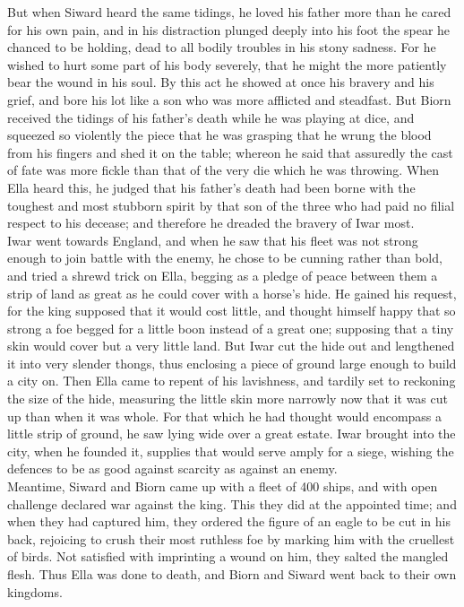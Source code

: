 \documentclass[10pt,a4paper]{report}
\begin{document}
But when Siward heard the same tidings, he loved his father more than he cared for his own pain, and in his distraction plunged deeply into his foot the spear he chanced to be holding, dead to all bodily troubles in his stony sadness. For he wished to hurt some part of his body severely, that he might the more patiently bear the wound in his soul. By this act he showed at once his bravery and his grief, and bore his lot like a son who was more afflicted and steadfast. But Biorn received the tidings of his father's death while he was playing at dice, and squeezed so violently the piece that he was grasping that he wrung the blood from his fingers and shed it on the table; whereon he said that assuredly the cast of fate was more fickle than that of the very die which he was throwing. When Ella heard this, he judged that his father's death had been borne with the toughest and most stubborn spirit by that son of the three who had paid no filial respect to his decease; and therefore he dreaded the bravery of Iwar most.\\

Iwar went towards England, and when he saw that his fleet was not strong enough to join battle with the enemy, he chose to be cunning rather than bold, and tried a shrewd trick on Ella, begging as a pledge of peace between them a strip of land as great as he could cover with a horse's hide. He gained his request, for the king supposed that it would cost little, and thought himself happy that so strong a foe begged for a little boon instead of a great one; supposing that a tiny skin would cover but a very little land. But Iwar cut the hide out and lengthened it into very slender thongs, thus enclosing a piece of ground large enough to build a city on. Then Ella came to repent of his lavishness, and tardily set to reckoning the size of the hide, measuring the little skin more narrowly now that it was cut up than when it was whole. For that which he had thought would encompass a little strip of ground, he saw lying wide over a great estate. Iwar brought into the city, when he founded it, supplies that would serve amply for a siege, wishing the defences to be as good against scarcity as against an enemy.\\

Meantime, Siward and Biorn came up with a fleet of 400 ships, and with open challenge declared war against the king. This they did at the appointed time; and when they had captured him, they ordered the figure of an eagle to be cut in his back, rejoicing to crush their most ruthless foe by marking him with the cruellest of birds. Not satisfied with imprinting a wound on him, they salted the mangled flesh. Thus Ella was done to death, and Biorn and Siward went back to their own kingdoms.\\
\end{document}

